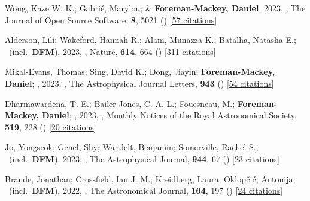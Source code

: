 \item[{\color{numcolor}\scriptsize94}] Wong, Kaze W. K.; Gabri{\'e}, Marylou; \& \textbf{Foreman-Mackey, Daniel}, 2023, , The Journal of Open Source Software, \textbf{8}, 5021 () [\href{https://ui.adsabs.harvard.edu/abs/2023JOSS....8.5021W}{57 citations}]

\item[{\color{numcolor}\scriptsize93}] Alderson, Lili; Wakeford, Hannah R.; Alam, Munazza K.; Batalha, Natasha E.; \etal\ (incl.\ \textbf{DFM}), 2023, , Nature, \textbf{614}, 664 () [\href{https://ui.adsabs.harvard.edu/abs/2023Natur.614..664A}{311 citations}]

\item[{\color{numcolor}\scriptsize92}] Mikal-Evans, Thomas; Sing, David K.; Dong, Jiayin; \textbf{Foreman-Mackey, Daniel}; \etal, 2023, , The Astrophysical Journal Letters, \textbf{943} () [\href{https://ui.adsabs.harvard.edu/abs/2023ApJ...943L..17M}{54 citations}]

\item[{\color{numcolor}\scriptsize91}] Dharmawardena, T. E.; Bailer-Jones, C. A. L.; Fouesneau, M.; \textbf{Foreman-Mackey, Daniel}; \etal, 2023, , Monthly Notices of the Royal Astronomical Society, \textbf{519}, 228 () [\href{https://ui.adsabs.harvard.edu/abs/2023MNRAS.519..228D}{20 citations}]

\item[{\color{numcolor}\scriptsize90}] Jo, Yongseok; Genel, Shy; Wandelt, Benjamin; Somerville, Rachel S.; \etal\ (incl.\ \textbf{DFM}), 2023, , The Astrophysical Journal, \textbf{944}, 67 () [\href{https://ui.adsabs.harvard.edu/abs/2023ApJ...944...67J}{23 citations}]

\item[{\color{numcolor}\scriptsize89}] Brande, Jonathan; Crossfield, Ian J. M.; Kreidberg, Laura; Oklop{\v{c}}i{\'c}, Antonija; \etal\ (incl.\ \textbf{DFM}), 2022, , The Astronomical Journal, \textbf{164}, 197 () [\href{https://ui.adsabs.harvard.edu/abs/2022AJ....164..197B}{24 citations}]

